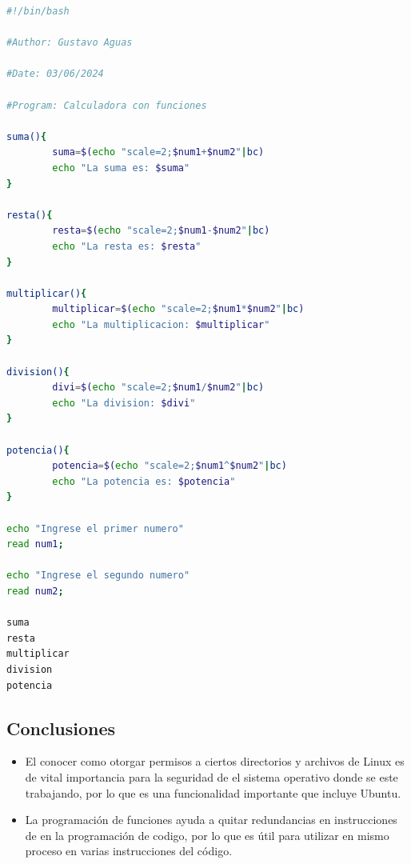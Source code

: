 \documentclass[11pt,twoside]{book}
\begin{document}
\begin{lstlisting}[language=bash, caption={Calculadora con funciones}]
#!/bin/bash

#Author: Gustavo Aguas

#Date: 03/06/2024

#Program: Calculadora con funciones

suma(){
        suma=$(echo "scale=2;$num1+$num2"|bc)
        echo "La suma es: $suma"
}

resta(){
        resta=$(echo "scale=2;$num1-$num2"|bc)
        echo "La resta es: $resta"
}

multiplicar(){
        multiplicar=$(echo "scale=2;$num1*$num2"|bc)
        echo "La multiplicacion: $multiplicar"
}

division(){
        divi=$(echo "scale=2;$num1/$num2"|bc)
        echo "La division: $divi"
}

potencia(){
        potencia=$(echo "scale=2;$num1^$num2"|bc)
        echo "La potencia es: $potencia"
}

echo "Ingrese el primer numero"
read num1;

echo "Ingrese el segundo numero"
read num2;

suma
resta
multiplicar
division
potencia
\end{lstlisting}
\subsection*{Conclusiones}
\begin{itemize}  
  \item El conocer como otorgar permisos a ciertos directorios y archivos de Linux es de vital importancia para la seguridad de el sistema operativo donde se este trabajando, por lo que es una funcionalidad importante que incluye Ubuntu.
  \item La programación de funciones ayuda a quitar redundancias en instrucciones de en la programación de codigo, por lo que es útil para utilizar en mismo proceso en varias instrucciones del código.
\end{itemize}
\end{document}
